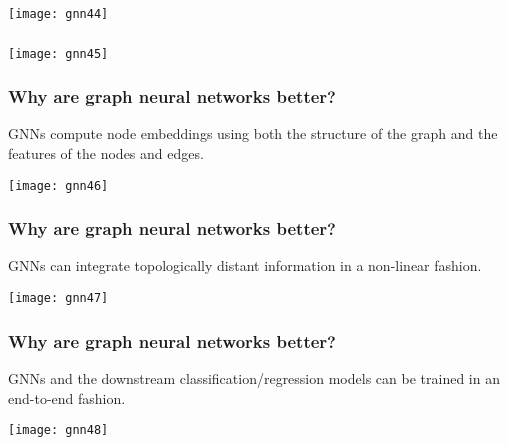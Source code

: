 \begin{frame}[fragile]\frametitle{}

\begin{center}
\texttt{[image: gnn44]}
\end{center}	  

\end{frame}

\begin{frame}[fragile]\frametitle{}

\begin{center}
\texttt{[image: gnn45]}
\end{center}	  

\end{frame}

\begin{frame}[fragile]\frametitle{Why are graph neural networks better?}

GNNs compute node embeddings using both the structure of the graph and the features of the nodes and edges.


\begin{center}
\texttt{[image: gnn46]}
\end{center}	  

\end{frame}

\begin{frame}[fragile]\frametitle{Why are graph neural networks better?}

GNNs can integrate topologically distant information in a non-linear fashion. 



\begin{center}
\texttt{[image: gnn47]}
\end{center}	  

\end{frame}

\begin{frame}[fragile]\frametitle{Why are graph neural networks better?}

GNNs and the downstream classification/regression models can be trained in an end-to-end fashion.


\begin{center}
\texttt{[image: gnn48]}
\end{center}	  

\end{frame}

